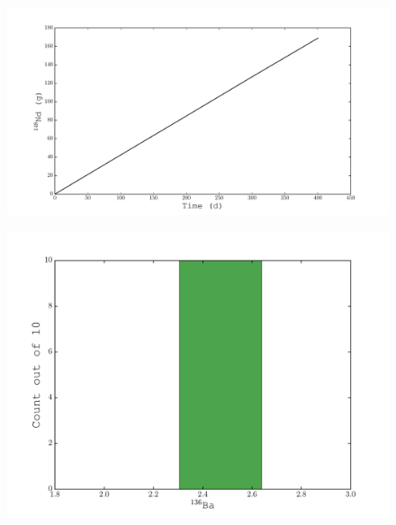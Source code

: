 \documentclass{beamer}
\begin{document}
\begin{frame}
    \begin{figure}[H]
    \begin{center}
      \includegraphics[width=0.77\columnwidth]{../Origen2/PLOTS/ND148Post_XY.pdf}
      \vspace{-5mm}
      \label{fig:POSTXYNd148}
    \end{center}
  \end{figure}
\end{frame}
    
\begin{frame}
  \begin{figure}[H]
    \begin{center}
      \includegraphics[width=0.77\columnwidth]{../Origen2/PLOTS/BA136Post_HIST.pdf}
      \vspace{-5mm}
      \label{fig:POSTHISTBa136}
    \end{center}
  \end{figure}
\end{frame}
  
\end{document}
